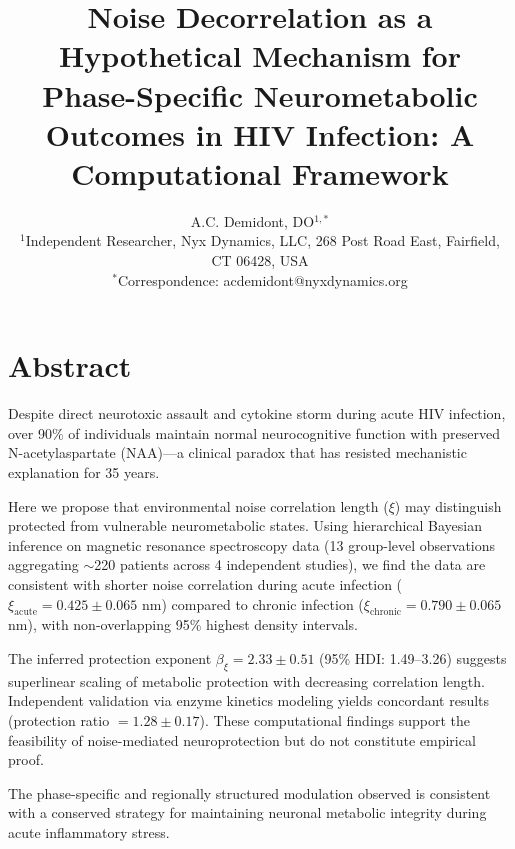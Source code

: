 \documentclass[10pt,a4paper]{article}
\makeatletter
\renewcommand{\maketitle}{
  \begin{center}
    {\LARGE\bfseries\@title\par}
    \vspace{1em}
    {\large\@author\par}
    \vspace{0.5em}
    {\small\@date\par}
  \end{center}
  \vspace{1em}
}
\makeatother
\begin{document}
\title{Noise Decorrelation as a Hypothetical Mechanism for Phase-Specific Neurometabolic Outcomes in HIV Infection: A Computational Framework}

\author{
A.C. Demidont, DO$^{1,*}$\\[0.5em]
{\small $^1$Independent Researcher, Nyx Dynamics, LLC, 268 Post Road East, Fairfield, CT 06428, USA}\\
{\small $^*$Correspondence: acdemidont@nyxdynamics.org}
}

\date{}

\maketitle

\section*{Abstract}

Despite direct neurotoxic assault and cytokine storm during acute HIV infection, over 90\% of individuals maintain normal neurocognitive function with preserved N-acetylaspartate (NAA)---a clinical paradox that has resisted mechanistic explanation for 35 years.

Here we propose that environmental noise correlation length ($\xi$) may distinguish protected from vulnerable neurometabolic states. Using hierarchical Bayesian inference on magnetic resonance spectroscopy data (13 group-level observations aggregating $\sim$220 patients across 4 independent studies), we find the data are consistent with shorter noise correlation during acute infection ($\xi_{\text{acute}} = 0.425 \pm 0.065$ nm) compared to chronic infection ($\xi_{\text{chronic}} = 0.790 \pm 0.065$ nm), with non-overlapping 95\% highest density intervals.

The inferred protection exponent $\beta_\xi = 2.33 \pm 0.51$ (95\% HDI: 1.49--3.26) suggests superlinear scaling of metabolic protection with decreasing correlation length. Independent validation via enzyme kinetics modeling yields concordant results (protection ratio $= 1.28 \pm 0.17$). These computational findings support the feasibility of noise-mediated neuroprotection but do not constitute empirical proof.

The phase-specific and regionally structured modulation observed is consistent with a conserved strategy for maintaining neuronal metabolic integrity during acute inflammatory stress.
\end{document}
